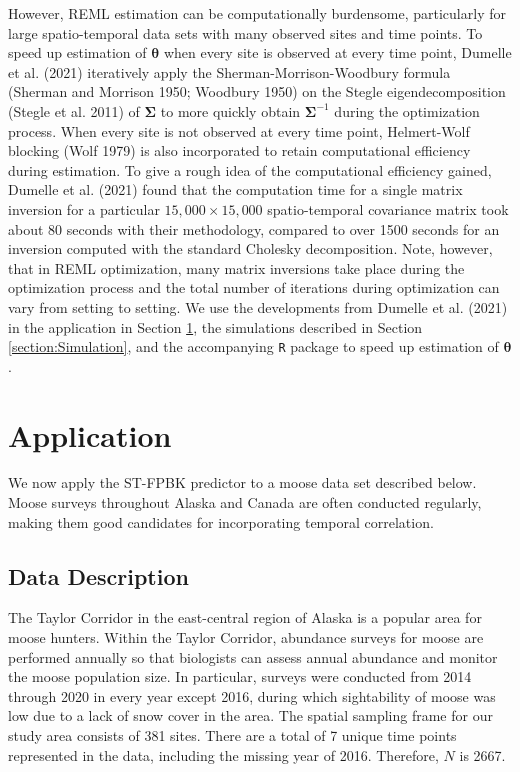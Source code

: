 \documentclass[]{article}    %
\begin{document}
However, REML estimation can be computationally burdensome, particularly
for large spatio-temporal data sets with many observed sites and time
points. To speed up estimation of \(\bm{\theta}\) when every site is
observed at every time point, Dumelle et al. (2021) iteratively apply
the Sherman-Morrison-Woodbury formula (Sherman and Morrison 1950;
Woodbury 1950) on the Stegle eigendecomposition (Stegle et al. 2011) of
\(\bm{\Sigma}\) to more quickly obtain \(\bm{\Sigma}^{-1}\) during the
optimization process. When every site is not observed at every time
point, Helmert-Wolf blocking (Wolf 1979) is also incorporated to retain
computational efficiency during estimation. To give a rough idea of the
computational efficiency gained, Dumelle et al. (2021) found that the
computation time for a single matrix inversion for a particular
\(15,000 \times 15,000\) spatio-temporal covariance matrix took about 80
seconds with their methodology, compared to over 1500 seconds for an
inversion computed with the standard Cholesky decomposition. Note,
however, that in REML optimization, many matrix inversions take place
during the optimization process and the total number of iterations
during optimization can vary from setting to setting. We use the
developments from Dumelle et al. (2021) in the application in Section
\ref{section:Application}, the simulations described in Section
\ref{section:Simulation}, and the accompanying \texttt{R} package to
speed up estimation of \(\bm{\theta}\).

\hypertarget{section:Application}{%
\section{Application}\label{section:Application}}

We now apply the ST-FPBK predictor to a moose data set described below.
Moose surveys throughout Alaska and Canada are often conducted
regularly, making them good candidates for incorporating temporal
correlation.

\hypertarget{data-description}{%
\subsection{Data Description}\label{data-description}}

The Taylor Corridor in the east-central region of Alaska is a popular
area for moose hunters. Within the Taylor Corridor, abundance surveys
for moose are performed annually so that biologists can assess annual
abundance and monitor the moose population size. In particular, surveys
were conducted from 2014 through 2020 in every year except 2016, during
which sightability of moose was low due to a lack of snow cover in the
area. The spatial sampling frame for our study area consists of 381
sites. There are a total of 7 unique time points represented in the
data, including the missing year of 2016. Therefore, \(N\) is 2667.
\end{document}
